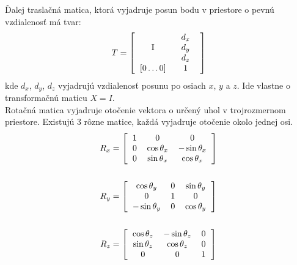 Ďalej traslačná matica, ktorá vyjadruje posun bodu v priestore o pevnú vzdialenosť má tvar:
\begin{equation}
	T = \left[
	\begin{tabular}{cc}
		I & 
			\begin{tabular}{c}
				$d_x$ \\
				$d_y$ \\
				$d_z$
			\end{tabular}
			 \\
		$[0\ldots0]$ & 1
	\end{tabular}
	\right]
\end{equation}
kde $d_x$, $d_y$, $d_z$ vyjadrujú vzdialenosť posunu po osiach $x$, $y$ a $z$. Ide vlastne o transformačnú maticu $X=I$.
\\

Rotačná matica vyjadruje otočenie  vektora o určený uhol v trojrozmernom priestore. Existujú 3 rôzne matice, každá vyjadruje otočenie okolo jednej osi.
\begin{align}
	R_x &= \left[
	\begin{tabular}{ccc}
	 1 & 0 & 0 \\
	 0 & $\cos\theta_x$ & $-\sin\theta_x$ \\
	 0 & $\sin\theta_x$ & $\cos\theta_x$
	\end{tabular}
	\right]	
		\nonumber \\
		\nonumber \\
	R_y &= \left[
	\begin{tabular}{ccc}
	 $\cos\theta_y$ & 0 & $\sin\theta_y$ \\
	 0 & 1 & 0 \\
	 $-\sin\theta_y$ & 0 & $\cos\theta_y$
	\end{tabular}
	\right] 
		\nonumber \\
		\nonumber \\
	R_z &= \left[
	\begin{tabular}{ccc}
	 $\cos\theta_z$ & $-\sin\theta_z$ & 0 \\
	 $\sin\theta_z$ & $\cos\theta_z$ & 0 \\
	 0 & 0 & 1
	\end{tabular}
	\right]
\end{align}

